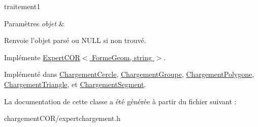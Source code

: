 traitement1 


\begin{DoxyParams}{Paramètres}
{\em objet} & \\
\hline
\end{DoxyParams}
\begin{DoxyReturn}{Renvoie}
l'objet parsé ou N\+U\+L\+L si non trouvé. 
\end{DoxyReturn}


Implémente \hyperlink{class_expert_c_o_r_a7574fdd9c8321c8d7e4be820740d0760}{Expert\+C\+O\+R$<$ Forme\+Geom, string $>$}.



Implémenté dans \hyperlink{class_chargement_cercle_addd0be00b764eb7736aac2386bbafabd}{Chargement\+Cercle}, \hyperlink{class_chargement_groupe_aa0487a2d01a2c8022fbaf854e79bafd6}{Chargement\+Groupe}, \hyperlink{class_chargement_polygone_a66c85c1a8a6aba246a283aaa18bfddd4}{Chargement\+Polygone}, \hyperlink{class_chargement_triangle_a5a56b270c58404c940900c5d93237876}{Chargement\+Triangle}, et \hyperlink{class_chargement_segment_ab03da7e3e7870d2522d72095ae827135}{Chargement\+Segment}.



La documentation de cette classe a été générée à partir du fichier suivant \+:\begin{DoxyCompactItemize}
\item 
chargement\+C\+O\+R/expertchargement.\+h\end{DoxyCompactItemize}
